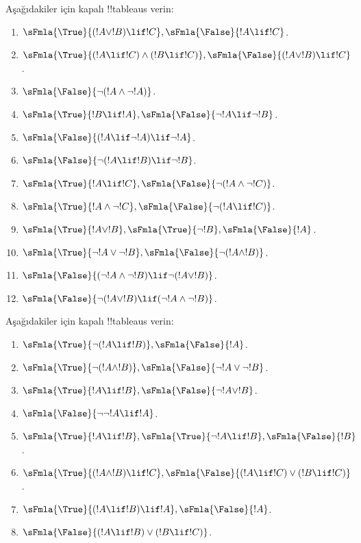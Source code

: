 \begin{prob}
Aşağıdakiler için kapalı !!{tableau}s verin:
\begin{enumerate}
\item $\sFmla{\True}{(!A \lor !B) \lif !C}, \sFmla{\False}{!A \lif !C}$.
\item $\sFmla{\True}{(!A \lif !C) \land (!B \lif !C)}, \sFmla{\False}{(!A \lor !B) \lif !C}$.
\item $\sFmla{\False}{\lnot(!A \land \lnot !A)}$.
\item $\sFmla{\True}{!B \lif !A}, \sFmla{\False}{\lnot !A \lif \lnot !B}$.
\item $\sFmla{\False}{(!A \lif \lnot !A) \lif \lnot !A}$.
\item $\sFmla{\False}{\lnot(!A \lif !B) \lif \lnot !B}$.
\item $\sFmla{\True}{!A \lif !C}, \sFmla{\False}{\lnot (!A \land \lnot !C)}$.
\item $\sFmla{\True}{!A \land \lnot !C}, \sFmla{\False}{\lnot (!A \lif !C)}$.
\item $\sFmla{\True}{!A \lor !B}, \sFmla{\True}{\lnot !B}, \sFmla{\False}{!A}$.
\item $\sFmla{\True}{\lnot !A \lor \lnot !B}, \sFmla{\False}{\lnot(!A \land !B)}$.
\item $\sFmla{\False}{(\lnot !A \land \lnot !B) \lif\lnot(!A \lor !B)}$.
\item $\sFmla{\False}{\lnot(!A \lor !B) \lif (\lnot !A \land \lnot !B)}$.
\end{enumerate}
\end{prob}

\begin{prob}
Aşağıdakiler için kapalı !!{tableau}s verin:
\begin{enumerate}
\item $\sFmla{\True}{\lnot(!A \lif !B)}, \sFmla{\False}{!A}$.
\item $\sFmla{\True}{\lnot(!A \land !B)}, \sFmla{\False}{\lnot !A \lor \lnot !B}$.
\item $\sFmla{\True}{!A \lif !B}, \sFmla{\False}{\lnot !A \lor !B}$.
\item $\sFmla{\False}{\lnot \lnot !A \lif !A}$.
\item $\sFmla{\True}{!A \lif !B}, \sFmla{\True}{\lnot !A \lif !B}, \sFmla{\False}{!B}$.
\item $\sFmla{\True}{(!A \land !B) \lif !C}, \sFmla{\False}{(!A \lif !C) \lor (!B \lif !C)}$.
\item $\sFmla{\True}{(!A \lif !B) \lif !A}, \sFmla{\False}{!A}$.
\item $\sFmla{\False}{(!A \lif !B) \lor (!B \lif !C)}$.
\end{enumerate}
\end{prob}

